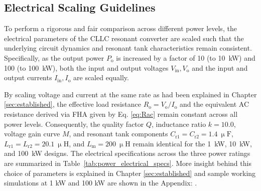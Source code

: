 \subsection{Electrical Scaling Guidelines}
To perform a rigorous and fair comparison across different power levels, the electrical parameters of the CLLC resonant converter are scaled such that the underlying circuit dynamics and resonant tank characteristics remain consistent. Specifically, as the output power $P_{\mathrm{o}}$ is increased by a factor of 10 (to 10~kW) and 100 (to 100~kW), both the input and output voltages $V_{\mathrm{in}}, V_{\mathrm{o}}$ and the input and output currents $I_{\mathrm{in}}, I_{\mathrm{o}}$ are scaled equally. 

By scaling voltage and current at the same rate as had been explained in Chapter \ref{sec:established}, the effective load resistance $R_{\mathrm{o}} = V_{\mathrm{o}}/I_{\mathrm{o}}$ and the equivalent AC resistance derived via FHA given by Eq. \ref{eq:Rac}
remain constant across all power levels. Consequently, the quality factor $Q$, inductance ratio $k = 10.0$, voltage gain curve $M$, and resonant tank components $C_{\mathrm{r1}} = C_{\mathrm{r2}} = 1.4~\upmu\text{F}$, $L_{\mathrm{r1}} = L_{\mathrm{r2}} = 20.1~\upmu\text{H}$, and $L_{\mathrm{m}} = 200~\upmu\text{H}$ remain identical for the 1~kW, 10~kW, and 100~kW designs. The electrical specifications across the three power ratings are summarized in Table~\ref{tab:power_electrical_specs}. More insight behind this choice of parameters is explained in Chapter \ref{sec:established} and sample working simulations at 1 kW and 100 kW are shown in the Appendix: . 

